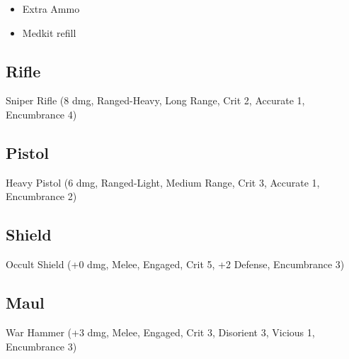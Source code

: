 \documentclass{book}
\begin{document}
\begin{multicols}{2}
\begin{itemize}
    \item Extra Ammo
    \item Medkit refill
\end{itemize}

\subsection{Rifle}

Sniper Rifle (8 dmg, Ranged-Heavy, Long Range, Crit 2, Accurate 1, Encumbrance 4)

\subsection{Pistol}

Heavy Pistol (6 dmg, Ranged-Light, Medium Range, Crit 3, Accurate 1, Encumbrance 2)

\subsection{Shield}

Occult Shield (+0 dmg, Melee, Engaged, Crit 5, +2 Defense, Encumbrance 3)

\subsection{Maul}

War Hammer (+3 dmg, Melee, Engaged, Crit 3, Disorient 3, Vicious 1, Encumbrance 3)



\end{multicols}
\end{document}
